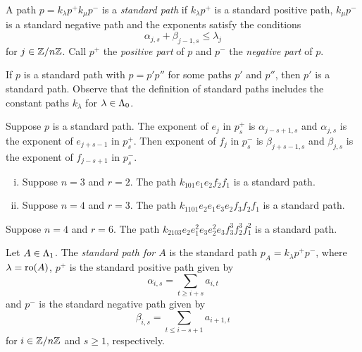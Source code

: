 \documentclass[a4paper, 11pt, twoside]{report}
\begin{document}
\begin{definition}\label{def:standard-paths}
A path $p=k_\lambda p^{+}k_\mu p^{-}$ is a \emph{standard path} if $k_\lambda p^{+}$ is a standard positive path, $k_\mu p^{-}$ is a standard negative path and the exponents satisfy the conditions
\begin{equation*}
\alpha_{j,s} + \beta_{j-1,s} \le \lambda_j
\end{equation*}
for $j\in\mathbb{Z}/{n \mathbb{Z}}$. Call $p^+$ the \emph{positive part} of $p$ and $p^-$ the \emph{negative part} of $p$.
\end{definition}

\begin{remark}
If $p$ is a standard path with $p=p'p''$ for some paths $p'$ and $p''$, then $p'$ is a standard path. Observe that the definition of standard paths includes the constant paths $k_\lambda$ for $\lambda\in\Lambda_0{}$.
\end{remark}

\begin{remark}
Suppose $p$ is a standard path. The exponent of $e_j$ in $p_s^+$ is $\alpha_{j-s+1,s}$ and $\alpha_{j,s}$ is the exponent of $e_{j+s-1}$ in $p_s^+$. Then exponent of $f_j$ in $p_s^-$ is $\beta_{j+s-1,s}$ and $\beta_{j,s}$ is the exponent of $f_{j-s+1}$ in $p_s^-$.
\end{remark}

\begin{example}
\begin{enumerate}[(i)]
\item
Suppose $n=3$ and $r=2$. The path $k_{101}e_1e_2f_2f_1$ is a standard path.

\item
Suppose $n=4$ and $r=3$. The path $k_{1101}e_2e_1e_3e_2f_3f_2f_1$ is a standard path.
\end{enumerate}

\item
Suppose $n=4$ and $r=6$. The path $k_{2103}e_2e_1^2e_3e_2^2e_3f_3^3f_2^3f_1^2$ is a standard path.
\end{example}

\begin{definition}\label{def:std-path-for-matrix}
Let $A\in\Lambda_1{}$. The \emph{standard path for $A$} is the standard path $p_A=k_\lambda p^+ p^-$, where $\lambda=\operatorname{ro}(A)$, $p^+$ is the standard positive path given by
\begin{equation*}
\alpha_{i,s} = \sum_{t\geq i+s} a_{i,t}
\end{equation*}
and $p^-$ is the standard negative path given by
\begin{equation*}
\beta_{i,s} = \sum_{t\le i-s+1} a_{i+1,t}
\end{equation*}
for $i\in\mathbb{Z}/{n \mathbb{Z}}$ and $s\geq 1$, respectively.
\end{definition}
\end{document}
